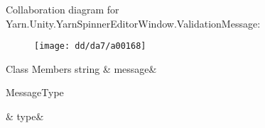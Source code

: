 Collaboration diagram for Yarn.\-Unity.\-Yarn\-Spinner\-Editor\-Window.\-Validation\-Message\-:
\nopagebreak
\begin{figure}[H]
\begin{center}
\leavevmode
\texttt{[image: dd/da7/a00168]}
\end{center}
\end{figure}
\begin{DoxyFields}{Class Members}
\hypertarget{a00085_a636dce6708e779c201fa5e7d01cf2955}{string}\label{a00085_a636dce6708e779c201fa5e7d01cf2955}
&
message&
\\
\hline

\hypertarget{a00085_a7d342190c7657fbbe85eb6fa66bcabb8}{Message\-Type}\label{a00085_a7d342190c7657fbbe85eb6fa66bcabb8}
&
type&
\\
\hline

\end{DoxyFields}
